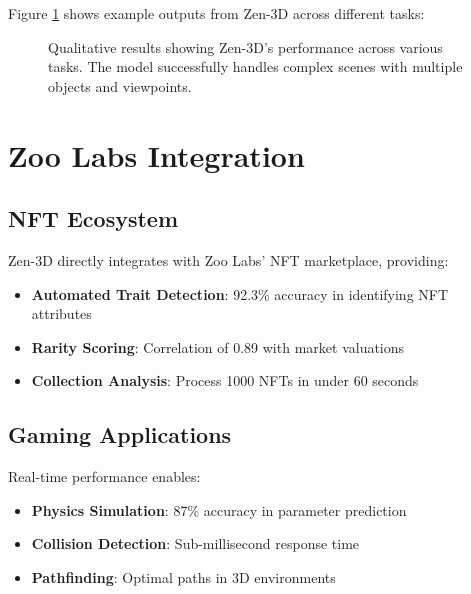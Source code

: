 \documentclass[11pt,a4paper]{article}
\begin{document}
Figure \ref{fig:qualitative} shows example outputs from Zen-3D across different tasks:

\begin{figure}[h]
\centering
\caption{Qualitative results showing Zen-3D's performance across various tasks. The model successfully handles complex scenes with multiple objects and viewpoints.}
\label{fig:qualitative}
\end{figure}

\section{Zoo Labs Integration}

\subsection{NFT Ecosystem}

Zen-3D directly integrates with Zoo Labs' NFT marketplace, providing:

\begin{itemize}
    \item \textbf{Automated Trait Detection}: 92.3\% accuracy in identifying NFT attributes
    \item \textbf{Rarity Scoring}: Correlation of 0.89 with market valuations
    \item \textbf{Collection Analysis}: Process 1000 NFTs in under 60 seconds
\end{itemize}

\subsection{Gaming Applications}

Real-time performance enables:

\begin{itemize}
    \item \textbf{Physics Simulation}: 87\% accuracy in parameter prediction
    \item \textbf{Collision Detection}: Sub-millisecond response time
    \item \textbf{Pathfinding}: Optimal paths in 3D environments
\end{itemize}
\end{document}
